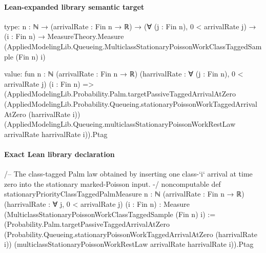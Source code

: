 \documentclass[10pt]{article}
\begin{document}
\paragraph{Lean-expanded library semantic target}
\begin{ReviewVerbatim}
type:
{n : ℕ} →
  (arrivalRate : Fin n → ℝ) →
    (∀ (j : Fin n), 0 < arrivalRate j) →
      (i : Fin n) →
        MeasureTheory.Measure (AppliedModelingLib.Queueing.MulticlassStationaryPoissonWorkClassTaggedSample (Fin n) i)

value:
fun {n : ℕ} (arrivalRate : Fin n → ℝ) (harrivalRate : ∀ (j : Fin n), 0 < arrivalRate j) (i : Fin n) =>
  (AppliedModelingLib.Probability.Palm.targetPassiveTaggedArrivalAtZero
      (AppliedModelingLib.Probability.Queueing.stationaryPoissonWorkTaggedArrivalAtZero (harrivalRate i))
      (AppliedModelingLib.Queueing.multiclassStationaryPoissonWorkRestLaw arrivalRate harrivalRate i)).Ptag
\end{ReviewVerbatim}

\paragraph{Exact Lean library declaration}
\begin{ReviewVerbatim}
/-- The class-tagged Palm law obtained by inserting one class-`i` arrival at
time zero into the stationary marked-Poisson input. -/
noncomputable def stationaryPriorityClassTaggedPalmMeasure
    {n : ℕ} (arrivalRate : Fin n → ℝ)
    (harrivalRate : ∀ j, 0 < arrivalRate j) (i : Fin n) :
    Measure (MulticlassStationaryPoissonWorkClassTaggedSample (Fin n) i) :=
  (Probability.Palm.targetPassiveTaggedArrivalAtZero
    (Probability.Queueing.stationaryPoissonWorkTaggedArrivalAtZero (harrivalRate i))
    (multiclassStationaryPoissonWorkRestLaw arrivalRate harrivalRate i)).Ptag
\end{ReviewVerbatim}
\end{document}
